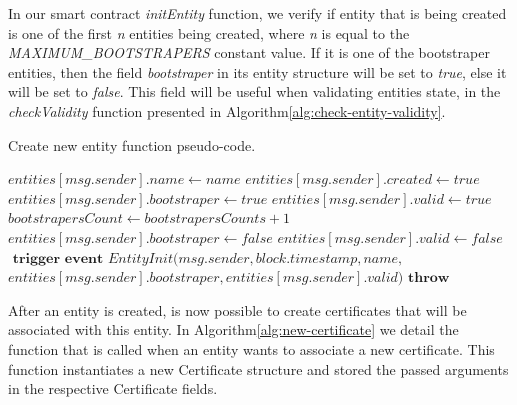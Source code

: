 In our smart contract \textit{initEntity} function, we verify if entity that is being created is one of the first \textit{n} entities being created, where \textit{n} is equal to the \textit{MAXIMUM\_BOOTSTRAPERS} constant value.
If it is one of the bootstraper entities, then the field \textit{bootstraper} in its entity structure will be set to \textit{true}, else it will be set to \textit{false}.
This field will be useful when validating entities state, in the \textit{checkValidity} function presented in Algorithm\ref{alg:check-entity-validity}.

\begin{algorithm}
  \caption{Create new entity function pseudo-code.}
  \label{alg:create-entity}
  \begin{algorithmic}[1]
        \State $entities[msg.sender].name \gets name$
        \State $entities[msg.sender].created \gets true$
        \State
          \State $entities[msg.sender].bootstraper \gets  true$
          \State $entities[msg.sender].valid \gets true$
          \State $bootstrapersCount \gets bootstrapersCounts + 1$
        \Else
          \State $entities[msg.sender].bootstraper \gets  false$
          \State $entities[msg.sender].valid \gets false$
        \EndIf
          \State
          \State $\textbf{ trigger event } EntityInit(msg.sender, block.timestamp, name,$
          \State $entities[msg.sender].bootstraper, entities[msg.sender].valid)$
      \Else
        \State $\textbf{throw}$
      \EndIf
    \EndFunction
  \end{algorithmic}
\end{algorithm}


After an entity is created, is now possible to create certificates that will be associated with this entity.
In Algorithm\ref{alg:new-certificate} we detail the function that is called when an entity wants to associate a new certificate.
This function instantiates a new Certificate structure and stored the passed arguments in the respective Certificate fields.

